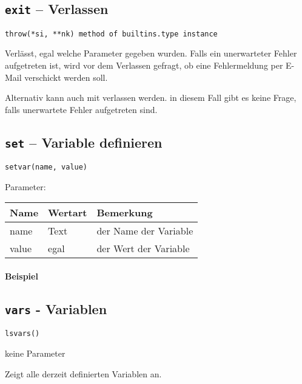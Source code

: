 \subsection{\texttt{exit} -- Verlassen}
\label{subsec:command_list:exit}

\begin{verbatim}
throw(*si, **nk) method of builtins.type instance
\end{verbatim}

Verlässt, egal welche Parameter gegeben wurden. Falls ein unerwarteter Fehler aufgetreten ist, wird vor dem Verlassen gefragt, ob eine Fehlermeldung per E-Mail verschickt werden soll.

Alternativ kann auch mit  verlassen werden. in diesem Fall gibt es keine Frage, falls unerwartete Fehler aufgetreten sind.

\subsection{\texttt{set} -- Variable definieren}
\label{subsec:command_list:set}

\begin{verbatim}
setvar(name, value)
\end{verbatim}

Parameter:

\begin{tabular}{|p{}|p{}|p{}|}
Name & Wertart & Bemerkung\\
\hline
name & Text & der Name der Variable \\
value & egal & der Wert der Variable
\end{tabular}

\paragraph{Beispiel}

\subsection{\texttt{vars} - Variablen}
\label{subsec:command_list:vars}

\begin{verbatim}
lsvars()
\end{verbatim}

keine Parameter

Zeigt alle derzeit definierten Variablen an.

